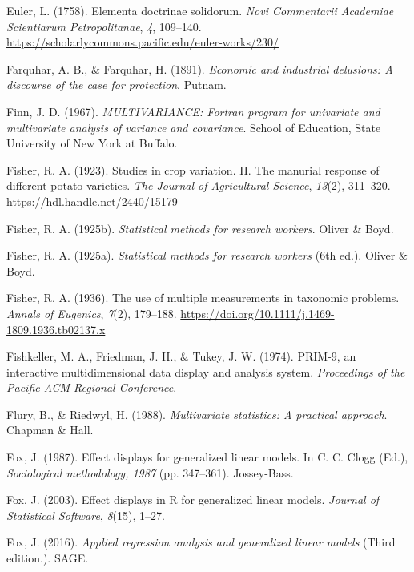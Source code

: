 \documentclass[
  letterpaper,
  10pt,
  krantz2]{krantz}
\newlength{\cslhangindent}
\newenvironment{CSLReferences}[2] %
 {\begin{list}{}{%
  \setlength{\itemindent}{0pt}
  \setlength{\leftmargin}{0pt}
  \setlength{\parsep}{0pt}
  \ifodd #1
   \setlength{\leftmargin}{\cslhangindent}
   \setlength{\itemindent}{-1\cslhangindent}
  \fi
  \setlength{\itemsep}{#2\baselineskip}}}
 {\end{list}}
\begin{document}
\begin{CSLReferences}{1}{0}
Euler, L. (1758). Elementa doctrinae solidorum. \emph{Novi Commentarii
Academiae Scientiarum Petropolitanae}, \emph{4}, 109--140.
\url{https://scholarlycommons.pacific.edu/euler-works/230/}

Farquhar, A. B., \& Farquhar, H. (1891). \emph{Economic and industrial
delusions: A discourse of the case for protection}. Putnam.

Finn, J. D. (1967). \emph{{MULTIVARIANCE}: Fortran program for
univariate and multivariate analysis of variance and covariance}. School
of Education, State University of New York at Buffalo.

Fisher, R. A. (1923). Studies in crop variation. II. The manurial
response of different potato varieties. \emph{The Journal of
Agricultural Science}, \emph{13}(2), 311--320.
\url{https://hdl.handle.net/2440/15179}

Fisher, R. A. (1925b). \emph{Statistical methods for research workers}.
Oliver \& Boyd.

Fisher, R. A. (1925a). \emph{Statistical methods for research workers}
(6th ed.). Oliver \& Boyd.

Fisher, R. A. (1936). The use of multiple measurements in taxonomic
problems. \emph{Annals of Eugenics}, \emph{7}(2), 179--188.
\url{https://doi.org/10.1111/j.1469-1809.1936.tb02137.x}

Fishkeller, M. A., Friedman, J. H., \& Tukey, J. W. (1974). {PRIM-9}, an
interactive multidimensional data display and analysis system.
\emph{Proceedings of the Pacific ACM Regional Conference}.

Flury, B., \& Riedwyl, H. (1988). \emph{Multivariate statistics: A
practical approach}. Chapman \& Hall.

Fox, J. (1987). Effect displays for generalized linear models. In C. C.
Clogg (Ed.), \emph{Sociological methodology, 1987} (pp. 347--361).
Jossey-Bass.

Fox, J. (2003). Effect displays in {R} for generalized linear models.
\emph{Journal of Statistical Software}, \emph{8}(15), 1--27.

Fox, J. (2016). \emph{Applied regression analysis and generalized linear
models} (Third edition.). SAGE.


\end{CSLReferences}
\end{document}
